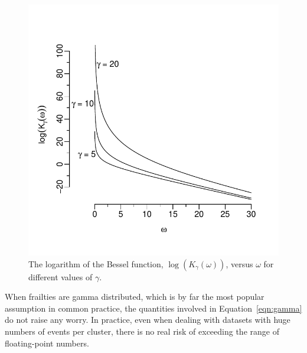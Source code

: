   \begin{figure}[htbp]
  \centering
  \includegraphics[width=.6\textwidth]{./graphs/bessel.pdf}
  \caption{The logarithm of the Bessel function, $\log ( K_{\gamma} ( \omega ) )$, versus $\omega$ for different values of $\gamma$.} 
  \label{fig:bessel}
  \end{figure}
% 
When frailties are gamma distributed,
  which is by far the most popular assumption in common practice, 
  the quantities involved in Equation~\ref{eqn:gamma} do not raise any worry.
In practice, even when dealing with datasets with huge numbers of events per cluster,
  there is no real risk of exceeding the range of floating-point numbers.